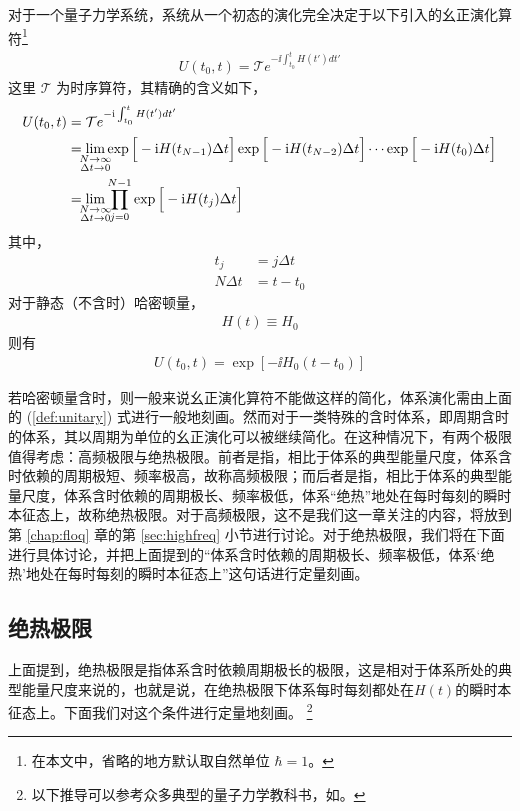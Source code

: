 对于一个量子力学系统，系统从一个初态的演化完全决定于以下引入的幺正演化算符\footnote{在本文中，省略的地方默认取自然单位 $\hbar=1$。}
\begin{align}
U(t_0,t)=\mathcal{T}e^{-\ii\int_{t_0}^t H(t')dt'}
\end{align}
这里 $\mathcal{T}$ 为时序算符，其精确的含义如下，
\begin{align}\label{def:unitary}
U(t_0, t)&=\mathcal{T}e^{-\ii\int_{t_0}^{t} H(t')dt'}\\
&= \lim_{\mathclap{\substack{N\rightarrow\infty\\\Delta t\rightarrow0}}}\exp\Big[-\ii H(t_{N-1})\Delta t\Big]\exp\Big[-\ii H(t_{N-2})\Delta t\Big]\cdots\exp\Big[-\ii H(t_0)\Delta t\Big]\\
&= \lim_{\mathclap{\substack{N\rightarrow\infty\\\Delta t\rightarrow0}}}\prod_{j=0}^{N-1}\exp\Big[-\ii H(t_j)\Delta t\Big]
\end{align}
其中，
\begin{align}
t_{j} &= j\Delta t \\
N\Delta t &= t-t_0
\end{align}
对于静态（不含时）哈密顿量，
\begin{align}
H(t)\equiv H_0
\end{align}
则有
\begin{align*}
U(t_0,t)=\exp[-\ii H_0(t-t_0)]
\end{align*}

若哈密顿量含时，则一般来说幺正演化算符不能做这样的简化，体系演化需由上面的 (\ref{def:unitary}) 式进行一般地刻画。然而对于一类特殊的含时体系，即周期含时的体系，其以周期为单位的幺正演化可以被继续简化。在这种情况下，有两个极限值得考虑：高频极限与绝热极限。前者是指，相比于体系的典型能量尺度，体系含时依赖的周期极短、频率极高，故称高频极限；而后者是指，相比于体系的典型能量尺度，体系含时依赖的周期极长、频率极低，体系“绝热”地处在每时每刻的瞬时本征态上，故称绝热极限。对于高频极限，这不是我们这一章关注的内容，将放到第 \ref{chap:floq} 章的第 \ref{sec:highfreq} 小节进行讨论。对于绝热极限，我们将在下面进行具体讨论，并把上面提到的“体系含时依赖的周期极长、频率极低，体系‘绝热’地处在每时每刻的瞬时本征态上”这句话进行定量刻画。

\subsection{绝热极限}\label{sec:adiabatic}
上面提到，绝热极限是指体系含时依赖周期极长的极限，这是相对于体系所处的典型能量尺度来说的，也就是说，在绝热极限下体系每时每刻都处在$H(t)$的瞬时本征态上。下面我们对这个条件进行定量地刻画。
\footnote{以下推导可以参考众多典型的量子力学教科书，如。}

